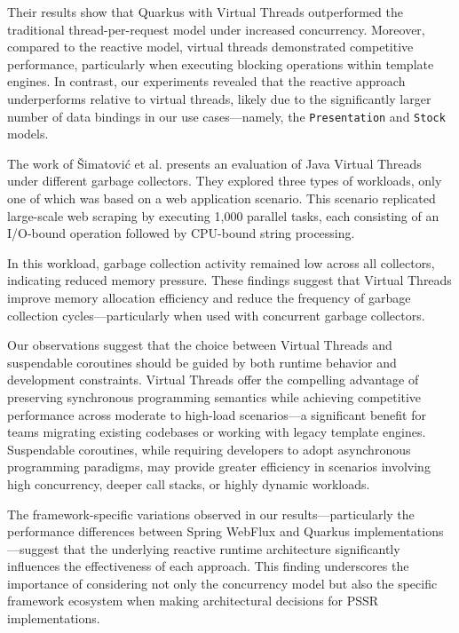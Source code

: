 Their results show that Quarkus with Virtual Threads outperformed the
traditional thread-per-request model under increased concurrency. Moreover,
compared to the reactive model, virtual threads demonstrated competitive
performance, particularly when executing blocking operations within template
engines. In contrast, our experiments revealed that the reactive approach
underperforms relative to virtual threads, likely due to the significantly
larger number of data bindings in our use cases—namely, the
\texttt{Presentation} and \texttt{Stock} models.

The work of Šimatović et al.\cite{vsimatovic2025evaluating} presents an
evaluation of Java Virtual Threads under different garbage collectors. They
explored three types of workloads, only one of which was based on a web
application scenario. This scenario replicated large-scale web scraping by
executing 1,000 parallel tasks, each consisting of an I/O-bound operation
followed by CPU-bound string processing.

In this workload, garbage collection activity remained low across all
collectors, indicating reduced memory pressure. These findings suggest that
Virtual Threads improve memory allocation efficiency and reduce the frequency
of garbage collection cycles—particularly when used with concurrent garbage
collectors.

Our observations suggest that the choice between Virtual Threads and
suspendable coroutines should be guided by both runtime behavior and
development constraints. Virtual Threads offer the compelling advantage of
preserving synchronous programming semantics while achieving competitive
performance across moderate to high-load scenarios—a significant benefit for
teams migrating existing codebases or working with legacy template engines.
Suspendable coroutines, while requiring developers to adopt asynchronous
programming paradigms, may provide greater efficiency in scenarios involving
high concurrency, deeper call stacks, or highly dynamic workloads.

The framework-specific variations observed in our results—particularly the
performance differences between Spring WebFlux and Quarkus
implementations—suggest that the underlying reactive runtime architecture
significantly influences the effectiveness of each approach. This finding
underscores the importance of considering not only the concurrency model but
also the specific framework ecosystem when making architectural decisions for
PSSR implementations.